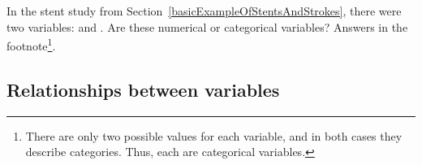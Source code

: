 \begin{exercise} 
In the stent study from Section~\ref{basicExampleOfStentsAndStrokes}, there were two variables:  and . Are these numerical or categorical variables? Answers in the footnote\footnote{There are only two possible values for each variable, and in both cases they describe categories. Thus, each are categorical variables.}.
\end{exercise}




\subsection{Relationships between variables}
\label{variableRelations}

